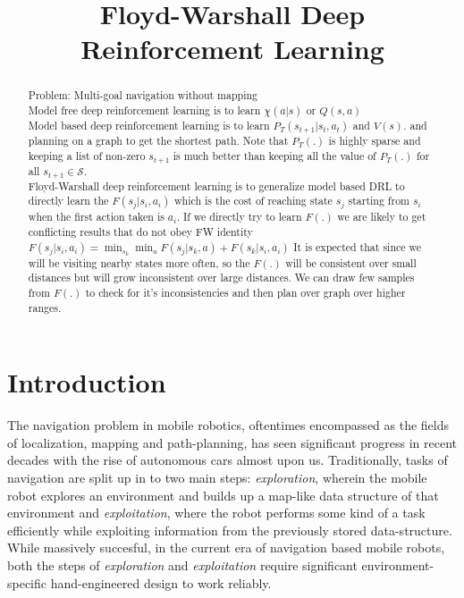 \documentclass[letterpaper]{article} %
\def\state{s}
\def\act{a}
\def\actt{\act_t}
\newcommand{\policy}{\chi}
\newcommand{\state}[2]{\mathbf{s}^{#1}(#2)}
\newcommand{\st}{\state}
\newcommand{\stn}{\st_{t+1}}
\newcommand{\stt}{\st_t}
\newcommand{\stk}{\st_k}
\newcommand{\stj}{\st_j}
\newcommand{\sti}{\st_i}
\newcommand{\St}{\mathcal{S}}
\newcommand{\acti}{\act_i}
\newcommand{\actt}{\act_t}
\newcommand{\trans}{P_T}
\newcommand{\Q}{\qValue}
\newcommand{\V}{V}
\newcommand{\fw}{\fwcost}
\newcommand{\fwcost}{F}
\newcommand{\qValue}{Q}
\begin{document}
%
\title{Floyd-Warshall Deep Reinforcement Learning}
\author{}
\maketitle
\begin{abstract}
Problem: Multi-goal navigation without mapping
\\
Model free deep reinforcement learning is to learn $\policy(\act | \st)$ or $\Q(\st, \act)$
\\
Model based deep reinforcement learning is to learn $\trans(\stn| \stt, \actt)$ and $\V(\st)$.
and planning on a graph to get the shortest path.
Note that $\trans(.)$ is highly sparse and keeping a list of non-zero $\stn$ is much better than
keeping all the value of $\trans(.)$ for all $\stn \in \St$.
\\
Floyd-Warshall deep reinforcement learning is to generalize model based DRL to
directly learn the $\fw(\stj|\sti, \acti)$ which is the cost of reaching state $\stj$
starting from $\sti$ when the first action taken is $\acti$.
If we directly try to learn $\fw(.)$ we are likely to get conflicting results
that do not obey FW identity
$\fw(\stj|\sti, \acti) = \min_{\stk} \min_\act \fw(\stj|\stk, \act) + \fw(\stk | \sti, \acti)$
It is expected that since we will be visiting nearby states more often, so the
$\fw(.)$ will be consistent over small distances but will grow inconsistent over
large distances.
We can draw few samples from $\fw(.)$ to check for it's inconsistencies and then 
plan over graph over higher ranges.
\end{abstract}


\section{ Introduction}

The navigation problem in mobile robotics, oftentimes encompassed as the
fields of localization, mapping and path-planning, has seen significant
progress in recent decades with the rise of autonomous cars almost upon
us. Traditionally, tasks of navigation are split up in to two main
steps: \emph{exploration}, wherein the mobile robot explores an
environment and builds up a map-like data structure of that environment
and \emph{exploitation}, where the robot performs some kind of a task
efficiently while exploiting information from the previously stored
data-structure. While massively succesful, in the current era of
navigation based mobile robots, both the steps of \emph{exploration} and
\emph{exploitation} require significant environment-specific
hand-engineered design to work reliably.
\end{document}

